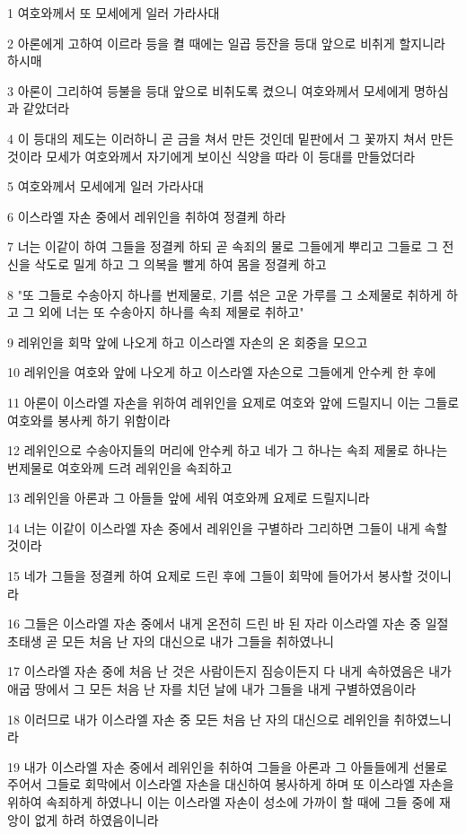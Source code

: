 \par 1 여호와께서 또 모세에게 일러 가라사대
\par 2 아론에게 고하여 이르라 등을 켤 때에는 일곱 등잔을 등대 앞으로 비취게 할지니라 하시매
\par 3 아론이 그리하여 등불을 등대 앞으로 비취도록 켰으니 여호와께서 모세에게 명하심과 같았더라
\par 4 이 등대의 제도는 이러하니 곧 금을 쳐서 만든 것인데 밑판에서 그 꽃까지 쳐서 만든 것이라 모세가 여호와께서 자기에게 보이신 식양을 따라 이 등대를 만들었더라
\par 5 여호와께서 모세에게 일러 가라사대
\par 6 이스라엘 자손 중에서 레위인을 취하여 정결케 하라
\par 7 너는 이같이 하여 그들을 정결케 하되 곧 속죄의 물로 그들에게 뿌리고 그들로 그 전신을 삭도로 밀게 하고 그 의복을 빨게 하여 몸을 정결케 하고
\par 8 "또 그들로 수송아지 하나를 번제물로, 기름 섞은 고운 가루를 그 소제물로 취하게 하고 그 외에 너는 또 수송아지 하나를 속죄 제물로 취하고"
\par 9 레위인을 회막 앞에 나오게 하고 이스라엘 자손의 온 회중을 모으고
\par 10 레위인을 여호와 앞에 나오게 하고 이스라엘 자손으로 그들에게 안수케 한 후에
\par 11 아론이 이스라엘 자손을 위하여 레위인을 요제로 여호와 앞에 드릴지니 이는 그들로 여호와를 봉사케 하기 위함이라
\par 12 레위인으로 수송아지들의 머리에 안수케 하고 네가 그 하나는 속죄 제물로 하나는 번제물로 여호와께 드려 레위인을 속죄하고
\par 13 레위인을 아론과 그 아들들 앞에 세워 여호와께 요제로 드릴지니라
\par 14 너는 이같이 이스라엘 자손 중에서 레위인을 구별하라 그리하면 그들이 내게 속할 것이라
\par 15 네가 그들을 정결케 하여 요제로 드린 후에 그들이 회막에 들어가서 봉사할 것이니라
\par 16 그들은 이스라엘 자손 중에서 내게 온전히 드린 바 된 자라 이스라엘 자손 중 일절 초태생 곧 모든 처음 난 자의 대신으로 내가 그들을 취하였나니
\par 17 이스라엘 자손 중에 처음 난 것은 사람이든지 짐승이든지 다 내게 속하였음은 내가 애굽 땅에서 그 모든 처음 난 자를 치던 날에 내가 그들을 내게 구별하였음이라
\par 18 이러므로 내가 이스라엘 자손 중 모든 처음 난 자의 대신으로 레위인을 취하였느니라
\par 19 내가 이스라엘 자손 중에서 레위인을 취하여 그들을 아론과 그 아들들에게 선물로 주어서 그들로 회막에서 이스라엘 자손을 대신하여 봉사하게 하며 또 이스라엘 자손을 위하여 속죄하게 하였나니 이는 이스라엘 자손이 성소에 가까이 할 때에 그들 중에 재앙이 없게 하려 하였음이니라
